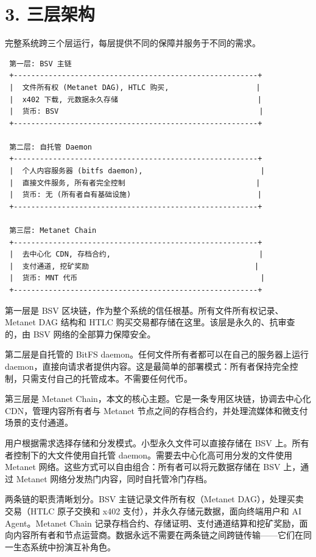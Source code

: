 \documentclass[11pt,a4paper]{article}
\begin{document}
\section{3. 三层架构}

完整系统跨三个层运行，每层提供不同的保障并服务于不同的需求。

\begin{lstlisting}
 第一层: BSV 主链
 +--------------------------------------------------------+
 |  文件所有权 (Metanet DAG), HTLC 购买,                    |
 |  x402 下载, 元数据永久存储                                |
 |  货币: BSV                                              |
 +--------------------------------------------------------+

 第二层: 自托管 Daemon
 +--------------------------------------------------------+
 |  个人内容服务器 (bitfs daemon),                           |
 |  直接文件服务, 所有者完全控制                              |
 |  货币: 无 (所有者自有基础设施)                             |
 +--------------------------------------------------------+

 第三层: Metanet Chain
 +--------------------------------------------------------+
 |  去中心化 CDN, 存档合约,                                  |
 |  支付通道, 挖矿奖励                                      |
 |  货币: MNT 代币                                          |
 +--------------------------------------------------------+
\end{lstlisting}

第一层是 BSV 区块链，作为整个系统的信任根基。所有文件所有权记录、Metanet DAG 结构和 HTLC 购买交易都存储在这里。该层是永久的、抗审查的，由 BSV 网络的全部算力保障安全。

第二层是自托管的 BitFS daemon。任何文件所有者都可以在自己的服务器上运行 daemon，直接向请求者提供内容。这是最简单的部署模式：所有者保持完全控制，只需支付自己的托管成本。不需要任何代币。

第三层是 Metanet Chain，本文的核心主题。它是一条专用区块链，协调去中心化 CDN，管理内容所有者与 Metanet 节点之间的存档合约，并处理流媒体和微支付场景的支付通道。

用户根据需求选择存储和分发模式。小型永久文件可以直接存储在 BSV 上。所有者控制下的大文件使用自托管 daemon。需要去中心化高可用分发的文件使用 Metanet 网络。这些方式可以自由组合：所有者可以将元数据存储在 BSV 上，通过 Metanet 网络分发热门内容，同时自托管冷门存档。

两条链的职责清晰划分。BSV 主链记录文件所有权（Metanet DAG），处理买卖交易（HTLC 原子交换和 x402 支付），并永久存储元数据，面向终端用户和 AI Agent。Metanet Chain 记录存档合约、存储证明、支付通道结算和挖矿奖励，面向内容所有者和节点运营商。数据永远不需要在两条链之间跨链传输——它们在同一生态系统中扮演互补角色。
\end{document}
